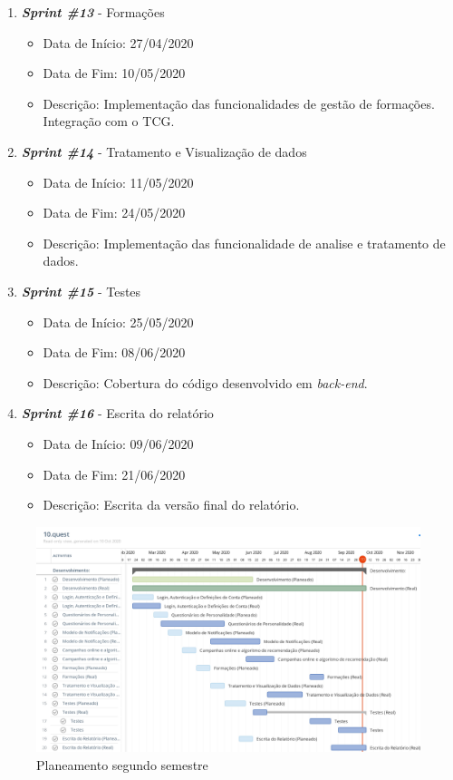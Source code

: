 \begin{enumerate}
\begin{itemize}
	\end{itemize}
	\item \textit{\textbf{Sprint \#13}} - Formações
	\begin{itemize}
		\item Data de Início: 27/04/2020
		\item Data de Fim: 10/05/2020
		\item Descrição: Implementação das funcionalidades de gestão de formações. Integração com o TCG.
	\end{itemize}
	\item \textit{\textbf{Sprint \#14}} - Tratamento e Visualização de dados
	\begin{itemize}
		\item Data de Início: 11/05/2020
		\item Data de Fim: 24/05/2020
		\item Descrição: Implementação das funcionalidade de analise e tratamento de dados. 
	\end{itemize}
	\item \textit{\textbf{Sprint \#15}} - Testes
	\begin{itemize}
		\item Data de Início: 25/05/2020
		\item Data de Fim: 08/06/2020
		\item Descrição: Cobertura do código desenvolvido em \textit{back-end}.
	\end{itemize}
	\item \textit{\textbf{Sprint \#16}} - Escrita do relatório
	\begin{itemize}
		\item Data de Início: 09/06/2020
		\item Data de Fim: 21/06/2020
		\item Descrição: Escrita da versão final do relatório.
	\end{itemize}
\end{enumerate}


\begin{figure}[ht!]
	\begin{center}
		\includegraphics[width=1\textwidth]{img/dev}
		\caption{Planeamento segundo semestre}
		\label{fig:plane 2 semestre}
	\end{center}
\end{figure}

